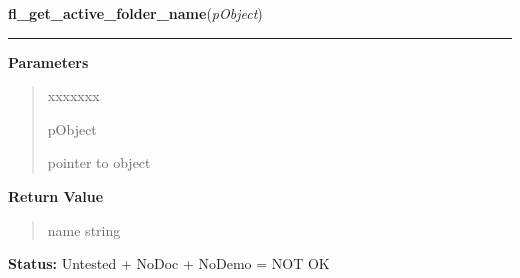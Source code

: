 \hspace{.8\funcindent}\begin{boxedminipage}{\funcwidth}

    \raggedright \textbf{fl\_get\_active\_folder\_name}(\textit{pObject})

    \vspace{-1.5ex}

    \rule{\textwidth}{0.5\fboxrule}
\setlength{\parskip}{2ex}
\setlength{\parskip}{1ex}
      \textbf{Parameters}
      \vspace{-1ex}

      \begin{quote}
        \begin{Ventry}{xxxxxxx}

          \item[pObject]

          pointer to object

        \end{Ventry}

      \end{quote}

      \textbf{Return Value}
    \vspace{-1ex}

      \begin{quote}
      name string

      \end{quote}

\textbf{Status:} Untested + NoDoc + NoDemo = NOT OK



    \end{boxedminipage}

    \label{xformslib:library:fl_get_folder_area}

    \vspace{0.5ex}

